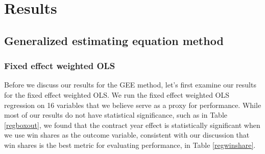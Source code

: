 \documentclass[12pt]{article}
\begin{document}
	\section{Results} \label{sec:result}
	
	\subsection{Generalized estimating equation method}
	
	\subsubsection{Fixed effect weighted OLS}
	
	Before we discuss our results for the GEE method, let's first examine our results for the fixed effect weighted OLS. We run the fixed effect weighted OLS regression on 16 variables that we believe serve as a proxy for performance. While most of our results do not have statistical significance, such as in Table \ref{regboxout}, we found that the contract year effect is statistically significant when we use win shares as the outcome variable, consistent with our discussion that win shares is the best metric for evaluating performance, in Table \ref{regwinshare}.
	
\end{document}
